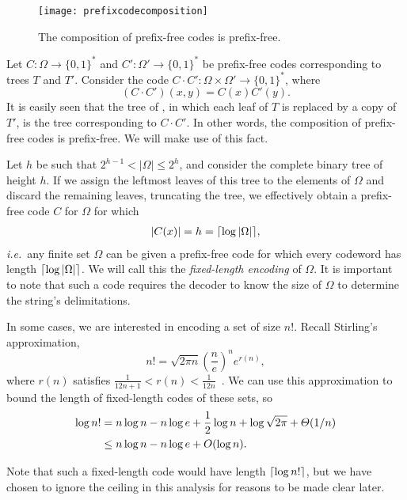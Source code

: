 \begin{figure}
  \centering
  \texttt{[image: prefixcodecomposition]}
  \caption{The composition of prefix-free codes is prefix-free.}
\end{figure}

Let $C : \Omega \to \{0, 1\}^*$ and $C' : \Omega' \to \{0, 1\}^*$ be
prefix-free codes corresponding to trees $T$ and $T'$. Consider the
code $C \cdot C' : \Omega \times \Omega' \to \{0, 1\}^*$, where
\[
(C \cdot C')(x, y) = C(x) C'(y).
\]
It is easily seen that the tree of , in
which each leaf of $T$ is replaced by a copy of $T'$, is the tree
corresponding to $C \cdot C'$. In other words, the composition of
prefix-free codes is prefix-free. We will make use of this fact.

Let $h$ be such that $2^{h - 1} < |\Omega| \leq 2^{h}$, and consider
the complete binary tree of height $h$. If we assign the leftmost
leaves of this tree to the elements of $\Omega$ and discard the
remaining leaves, truncating the tree, we effectively obtain a
prefix-free code $C$ for $\Omega$ for which
\begin{align}
  |C(x)| = h = \ceil{\log |\Omega|}, \eqlabel{fixed-length}
\end{align}
\emph{i.e.}~any finite set $\Omega$ can be given a prefix-free code
for which every codeword has length ${\lceil \log |\Omega| \rceil}$. We will
call this the \emph{fixed-length encoding} of $\Omega$. It is
important to note that such a code requires the decoder to know the
size of $\Omega$ to determine the string's delimitations.

\begin{exm}
  In some cases, we are interested in encoding a set of size
  $n!$. Recall Stirling's approximation,
  \[
  n! = \sqrt{2 \pi n} \left(\frac{n}{e}\right)^n e^{r(n)},
  \]
  where $r(n)$ satisfies
  $\frac{1}{12n + 1} < r(n) < \frac{1}{12n}$~\cite{robbins:stirling}.
  We can use this approximation to bound the length of fixed-length
  codes of these sets, so
  \begin{align}
    \log n! & = n \log n - n \log e + \frac{1}{2} \log n + \log \sqrt{2\pi} + \varTheta(1/n)  \notag \\
            & \leq n \log n - n \log e + O(\log n). \eqlabel{perm-code-loose} \enspace
  \end{align}

  Note that such a fixed-length code would have length
  ${\lceil \log n! \rceil}$, but we have chosen to ignore the ceiling in this
  analysis for reasons to be made clear later.
\end{exm}

